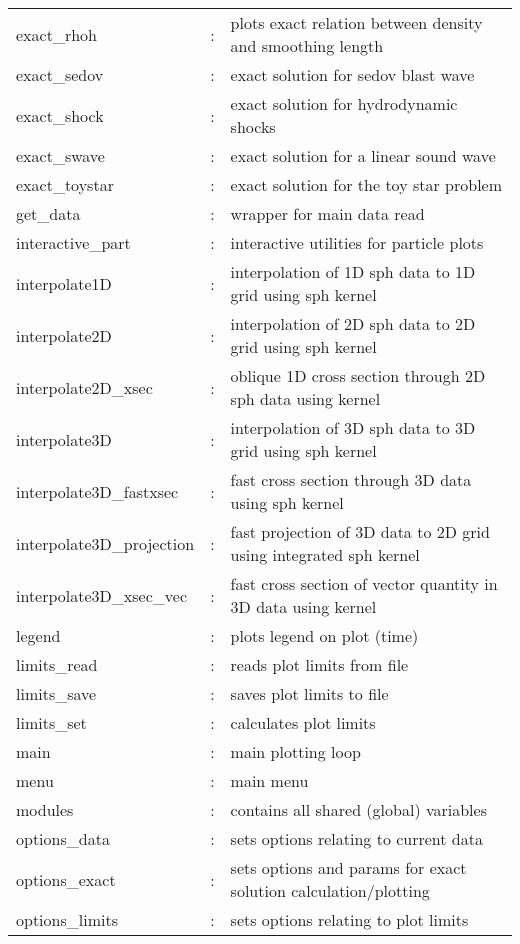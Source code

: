 \documentclass[a4paper,12pt]{article}
\begin{document}
\begin{longtable}{|lcp{}|}
exact\_rhoh	 & : & plots exact relation between density and smoothing length\\
exact\_sedov        & : & exact solution for sedov blast wave\\
exact\_shock        & : & exact solution for hydrodynamic shocks\\
exact\_swave        & : & exact solution for a linear sound wave\\
exact\_toystar      & : & exact solution for the toy star problem\\
get\_data           & : & wrapper for main data read\\
interactive\_part   & : & interactive utilities for particle plots\\
interpolate1D	 & : & interpolation of 1D sph data to 1D grid using sph kernel\\
interpolate2D	 & : & interpolation of 2D sph data to 2D grid using sph kernel  \\   
interpolate2D\_xsec & : & oblique 1D cross section through 2D sph data using kernel\\
interpolate3D	 & : & interpolation of 3D sph data to 3D grid using sph kernel\\
interpolate3D\_fastxsec   & : & fast cross section through 3D data using sph kernel\\
interpolate3D\_projection & : & fast projection of 3D data to 2D grid using integrated sph kernel\\
interpolate3D\_xsec\_vec   & : & fast cross section of vector quantity in 3D data using kernel\\
legend		       & : & plots legend on plot (time)\\
limits\_read              & : & reads plot limits from file\\
limits\_save              & : & saves plot limits to file\\
limits\_set               & : & calculates plot limits\\
main               & : & main plotting loop\\
menu               & : & main menu\\
modules		 & : & contains all shared (global) variables\\
options\_data       & : & sets options relating to current data\\
options\_exact	 & : & sets options and params for exact solution calculation/plotting\\
options\_limits     & : & sets options relating to plot limits\\

\end{longtable}
\end{document}
